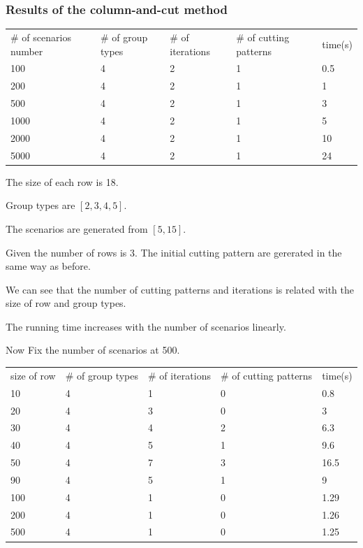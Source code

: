 \subsubsection{Results of the column-and-cut method}



\begin{table}[ht]
  \begin{tabular}{l|l|l|l|l}
  \hline
  \# of scenarios number & \# of group types & \# of iterations & \# of cutting patterns & time(s) \\
  100  & 4  & 2 & 1 & 0.5 \\
  200  & 4  & 2 & 1 & 1 \\
  500  & 4  & 2 & 1 & 3 \\
  1000 & 4 & 2 & 1 & 5 \\
  2000 & 4 & 2 & 1 & 10 \\
  5000 & 4 & 2 & 1 & 24\\
  \hline
  \end{tabular}
\end{table}

The size of each row is 18.

Group types are $[2,3,4,5]$.

The scenarios are generated from $[5,15]$.

Given the number of rows is 3. The initial cutting pattern are gererated in the same way as before.

We can see that the number of cutting patterns and iterations is related with the size of row and group types.

The running time increases with the number of scenarios linearly.

Now Fix the number of scenarios at 500.

\begin{table}[ht]
  \begin{tabular}{l|l|l|l|l}
  \hline
  size of row & \# of group types & \# of iterations & \# of cutting patterns & time(s) \\
  10  & 4  & 1 & 0 & 0.8 \\
  20  & 4  & 3 & 0 & 3 \\
  30  & 4  & 4 & 2 & 6.3 \\
  40  & 4  & 5 & 1 & 9.6 \\
  50  & 4  & 7 & 3 & 16.5 \\
  90  & 4  & 5 & 1 & 9 \\
  100 & 4 & 1 & 0 & 1.29 \\
  200 & 4 & 1 & 0 & 1.26 \\
  500 & 4 & 1 & 0 & 1.25 \\
  \hline
  \end{tabular}
\end{table}

